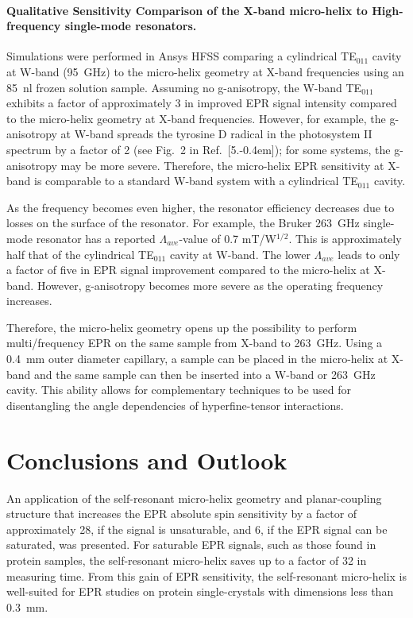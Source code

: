 \paragraph{Qualitative Sensitivity Comparison of the X-band micro-helix to High-frequency single-mode resonators.}
Simulations were performed in Ansys HFSS comparing a cylindrical TE$_{011}$ cavity at W-band (95~GHz) to the micro-helix geometry at X-band frequencies using an 85~nl frozen solution sample. Assuming no g-anisotropy, the W-band TE$_{011}$ exhibits a factor of approximately 3 in improved EPR signal intensity compared to the micro-helix geometry at X-band frequencies. However, for example, the g-anisotropy at W-band spreads the tyrosine D radical in the photosystem II spectrum by a factor of 2 (see Fig.~2 in Ref.~[5.\kern-0.4em]); for some systems, the g-anisotropy may be more severe. Therefore, the micro-helix EPR sensitivity at X-band is comparable to a standard W-band system with a cylindrical TE$_{011}$ cavity. 

As the frequency becomes even higher, the resonator efficiency decreases due to losses on the surface of the resonator. For example, the Bruker 263~GHz single-mode resonator has a reported $\Lambda_{ave}$-value of 0.7 mT/W$^{1/2}$. \cite{bruker263} This is approximately half that of the cylindrical TE$_{011}$ cavity at W-band. The lower $\Lambda_{ave}$ leads to only a factor of five in EPR signal improvement compared to the micro-helix at X-band. However, g-anisotropy becomes more severe as the operating frequency increases.

Therefore, the micro-helix geometry opens up the possibility to perform multi\-/frequency EPR on the same sample from X-band to 263~GHz. Using a 0.4~mm outer diameter capillary, a sample can be placed in the micro-helix at X-band and the same sample can then be inserted into a W-band or 263~GHz cavity. This ability allows for complementary techniques to be used for disentangling the angle dependencies of hyperfine-tensor interactions.


\section{Conclusions and Outlook}
An application of the self-resonant micro-helix geometry and planar-coupling structure that increases the EPR absolute spin sensitivity by a factor of approximately 28, if the signal is unsaturable, and 6, if the EPR signal can be saturated, was presented. For saturable EPR signals, such as those found in protein samples, the self-resonant micro-helix saves up to a factor of 32 in measuring time. From this gain of EPR sensitivity, the self-resonant micro-helix is well-suited for EPR studies on protein single-crystals with dimensions less than 0.3~mm. 

